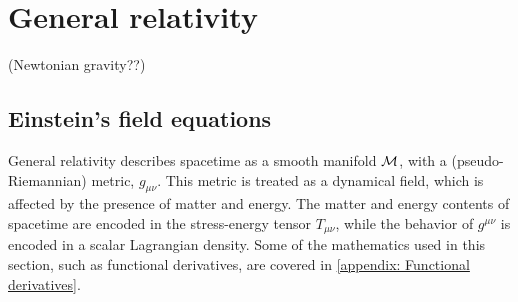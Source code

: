 \section{General relativity}

(Newtonian gravity??)


\subsection{Einstein's field equations}

General relativity describes spacetime as a smooth manifold $\mathcal{M}$, with a (pseudo-Riemannian) metric, $g_{\mu \nu}$.
This metric is treated as a dynamical field, which is affected by the presence of matter and energy.
The matter and energy contents of spacetime are encoded in the stress-energy tensor $T_{\mu \nu}$, while the behavior of $g^{\mu \nu}$ is encoded in a scalar Lagrangian density.
Some of the mathematics used in this section, such as functional derivatives, are covered in \autoref{appendix: Functional derivatives}.

